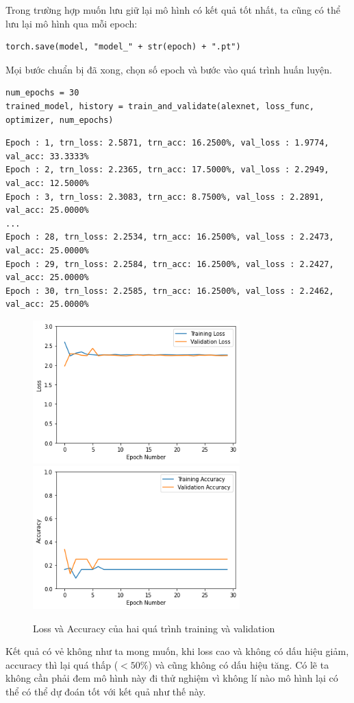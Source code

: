 \documentclass[a4paper]{article}
\begin{document}
Trong trường hợp muốn lưu giữ lại mô hình có kết quả tốt nhất, ta cũng có thể lưu lại mô hình qua mỗi epoch:
\begin{lstlisting}
torch.save(model, "model_" + str(epoch) + ".pt")
\end{lstlisting}
Mọi bước chuẩn bị đã xong, chọn số epoch và bước vào quá trình huấn luyện.
\begin{lstlisting}
num_epochs = 30
trained_model, history = train_and_validate(alexnet, loss_func, optimizer, num_epochs)
\end{lstlisting}
\begin{verbatim}
Epoch : 1, trn_loss: 2.5871, trn_acc: 16.2500%, val_loss : 1.9774, val_acc: 33.3333%
Epoch : 2, trn_loss: 2.2365, trn_acc: 17.5000%, val_loss : 2.2949, val_acc: 12.5000%
Epoch : 3, trn_loss: 2.3083, trn_acc: 8.7500%, val_loss : 2.2891, val_acc: 25.0000%
...
Epoch : 28, trn_loss: 2.2534, trn_acc: 16.2500%, val_loss : 2.2473, val_acc: 25.0000%
Epoch : 29, trn_loss: 2.2584, trn_acc: 16.2500%, val_loss : 2.2427, val_acc: 25.0000%
Epoch : 30, trn_loss: 2.2585, trn_acc: 16.2500%, val_loss : 2.2462, val_acc: 25.0000%
\end{verbatim}
\begin{figure}[h!]
\centering
{{\includegraphics[width=8cm]{images/loss.png} }}
\qquad
{{\includegraphics[width=8cm]{images/acc.png} }}
\caption*{Loss và Accuracy của hai quá trình training và validation}
\end{figure}
Kết quả có vẻ không như ta mong muốn, khi loss cao và không có dấu hiệu giảm, accuracy thì lại quá thấp ($< 50\%$) và cũng không có dấu hiệu tăng. Có lẽ ta không cần phải đem mô hình này đi thử nghiệm vì không lí nào mô hình lại có thể có thể dự đoán tốt với kết quả như thế này.\\
\end{document}
